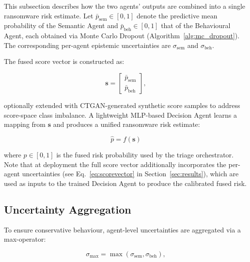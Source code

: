 \documentclass[3p]{elsarticle}
\begin{document}
\begin{changedblock}
This subsection describes how the two agents' outputs are combined into a single ransomware risk estimate.
Let $\bar{p}_{\text{sem}} \in [0,1]$ denote the predictive mean probability of the Semantic Agent
and $\bar{p}_{\text{beh}} \in [0,1]$ that of the Behavioural Agent, each obtained via Monte Carlo
Dropout (Algorithm~\ref{alg:mc_dropout}).
The corresponding per-agent epistemic uncertainties are $\sigma_{\text{sem}}$ and $\sigma_{\text{beh}}$.
\end{changedblock}
The fused score vector is constructed as:

\begin{equation}
\mathbf{s} =
\begin{bmatrix}
\bar{p}_{\text{sem}} \\
\bar{p}_{\text{beh}}
\end{bmatrix},
\label{eq:scorevec_basic}
\end{equation}

optionally extended with CTGAN-generated synthetic score samples to address score-space class imbalance.
A lightweight MLP-based Decision Agent learns a mapping from $\mathbf{s}$ and produces a unified
ransomware risk estimate:

\begin{equation}
\hat{p} = f(\mathbf{s})
\label{eq:scorepool}
\end{equation}

\begin{changedblock}
where $\hat{p} \in [0,1]$ is the fused risk probability used by the triage orchestrator.
Note that at deployment the full score vector additionally incorporates the per-agent uncertainties
(see Eq.~\ref{eq:scorevector} in Section~\ref{sec:results}), which are used as inputs to the
trained Decision Agent to produce the calibrated fused risk.
\end{changedblock}

\subsection{Uncertainty Aggregation}

To ensure conservative behaviour, agent-level uncertainties are aggregated via a max-operator:

\begin{equation}
\sigma_{\max} = \max(\sigma_{\text{sem}}, \sigma_{\text{beh}}),
\label{eq:sigmamax}
\end{equation}
\end{document}
